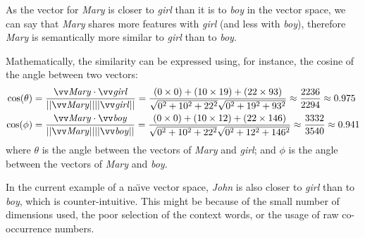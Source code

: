As the vector for \textit{Mary} is closer to \textit{girl} than it is to \textit{boy} in the vector space, we can say that \textit{Mary} shares more features with \textit{girl} (and less  with \textit{boy}), therefore \textit{Mary} is semantically more similar to \textit{girl} than to \textit{boy}.

Mathematically, the similarity can be expressed using, for instance, the cosine of the angle between two vectors:
%
\begin{align*}
\cos(\theta) &=
\frac{\ov{\mathit{Mary}}\cdot\ov{\mathit{girl}}}
{||\ov{\mathit{Mary}}||||\ov{\mathit{girl}}||} =
%
\frac{(0\times0) + (10\times19) + (22\times93)}
{\sqrt{0^2 + 10^2 + 22^2}\sqrt{0^2 + 19^2 + 93^2}} \approx
\frac{2236}{2294} \approx 0.975
 \\
\cos(\phi) &=
\frac{\ov{\mathit{Mary}}\cdot\ov{\mathit{boy}}}
{||\ov{\mathit{Mary}}||||\ov{\mathit{boy}}||} =
%
\frac{(0\times0) + (10\times12) + (22\times146)}
{\sqrt{0^2 + 10^2 + 22^2}\sqrt{0^2 + 12^2 + 146^2}} \approx
\frac{3332}{3540} \approx 0.941
\end{align*}
%
where $\theta$ is the angle between the vectors of \textit{Mary} and \textit{girl}; and $\phi$ is the angle between the vectors of \textit{Mary} and \textit{boy}.

In the current example of a na{\"\i}ve vector space, \textit{John} is also closer to \textit{girl} than to \textit{boy}, which is counter-intuitive. This might be because of the small number of dimensions used, the poor selection of the context words, or the usage of raw co-occurrence numbers.%


